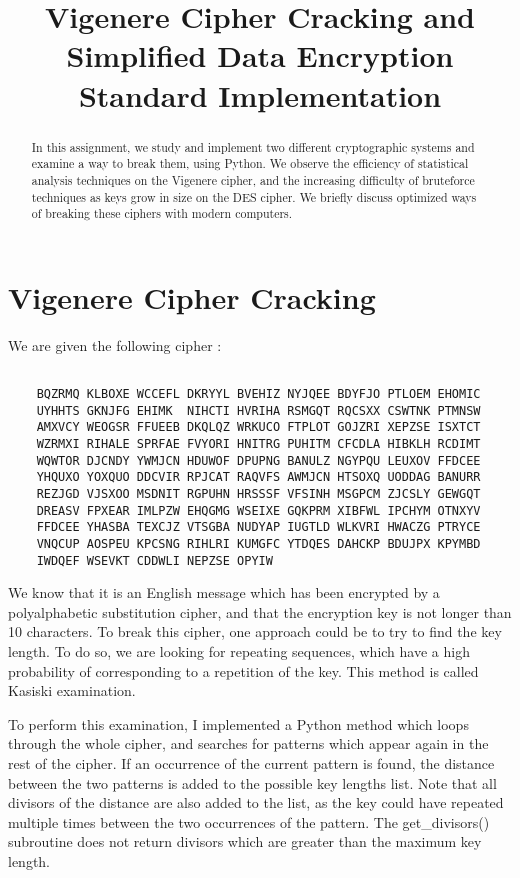 \documentclass{article}
\title{\textbf{Vigenere Cipher Cracking and Simplified Data Encryption Standard Implementation}}
\author{}
\date{}
\begin{document}
\maketitle \thispagestyle{fancy}

\begin{abstract}
    In this assignment, we study and implement two different cryptographic systems and examine a way to break them, using Python. We observe the efficiency of statistical analysis techniques on the Vigenere cipher, and the increasing difficulty of bruteforce techniques as keys grow in size on the DES cipher. We briefly discuss optimized ways of breaking these ciphers with modern computers.
\end{abstract}

\section{Vigenere Cipher Cracking} \label{vignere}

We are given the following cipher :

\begin{verbatim}

    BQZRMQ KLBOXE WCCEFL DKRYYL BVEHIZ NYJQEE BDYFJO PTLOEM EHOMIC
    UYHHTS GKNJFG EHIMK  NIHCTI HVRIHA RSMGQT RQCSXX CSWTNK PTMNSW
    AMXVCY WEOGSR FFUEEB DKQLQZ WRKUCO FTPLOT GOJZRI XEPZSE ISXTCT
    WZRMXI RIHALE SPRFAE FVYORI HNITRG PUHITM CFCDLA HIBKLH RCDIMT
    WQWTOR DJCNDY YWMJCN HDUWOF DPUPNG BANULZ NGYPQU LEUXOV FFDCEE
    YHQUXO YOXQUO DDCVIR RPJCAT RAQVFS AWMJCN HTSOXQ UODDAG BANURR
    REZJGD VJSXOO MSDNIT RGPUHN HRSSSF VFSINH MSGPCM ZJCSLY GEWGQT
    DREASV FPXEAR IMLPZW EHQGMG WSEIXE GQKPRM XIBFWL IPCHYM OTNXYV
    FFDCEE YHASBA TEXCJZ VTSGBA NUDYAP IUGTLD WLKVRI HWACZG PTRYCE
    VNQCUP AOSPEU KPCSNG RIHLRI KUMGFC YTDQES DAHCKP BDUJPX KPYMBD
    IWDQEF WSEVKT CDDWLI NEPZSE OPYIW

\end{verbatim}

We know that it is an English message which has been encrypted by a polyalphabetic substitution cipher, and that the encryption key is not longer than 10 characters. To break this cipher, one approach could be to try to find the key length. To do so, we are looking for repeating sequences, which have a high probability of corresponding to a repetition of the key. This method is called Kasiski examination.\cite{vigenere} \cite{kasiski}

To perform this examination, I implemented a Python method which loops through the whole cipher, and searches for patterns which appear again in the rest of the cipher. If an occurrence of the current pattern is found, the distance between the two patterns is added to the possible key lengths list. Note that all divisors of the distance are also added to the list, as the key could have repeated multiple times between the two occurrences of the pattern. The get\_divisors() subroutine does not return divisors which are greater than the maximum key length.
\bigskip
\end{document}
